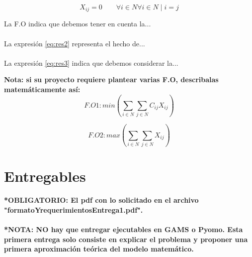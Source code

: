 \documentclass[runningheads]{llncs}
\begin{document}
\begin{equation}
 X_{ij} = 0   \qquad \forall{i \in N} \forall{i \in N} \mid i=j
 \label{eq:res3}
\end{equation}

La F.O indica que debemos tener en cuenta la...
\\
\\
La expresi\'{o}n \ref{eq:res2} representa el hecho de...
\\
\\
La expresi\'{o}n \ref{eq:res3} indica que debemos considerar la...

\textbf{Nota: si su proyecto requiere plantear varias F.O, describalas matem\'{a}ticamente as\'{i}:}
\begin{equation}
F.O 1: min (\sum_{i \in N} \sum_{j \in N} C_{ij} X_{ij}) 
\nonumber
\label{eq:res4}
\end{equation}

\begin{equation}
F.O 2: max (\sum_{i \in N} \sum_{j \in N} X_{ij})
\label{eq:res5}
\end{equation}


\section{Entregables}
\textbf{*OBLIGATORIO: El pdf con lo solicitado en el archivo "formatoYrequerimientosEntrega1.pdf".}
\\ \\
\textbf{*NOTA: NO hay que entregar ejecutables en GAMS o Pyomo. Esta primera entrega solo consiste en explicar el problema y proponer una primera aproximaci\'{o}n te\'{o}rica del modelo matem\'{a}tico.}


%
%
%
% 
% 
%
\end{document}
